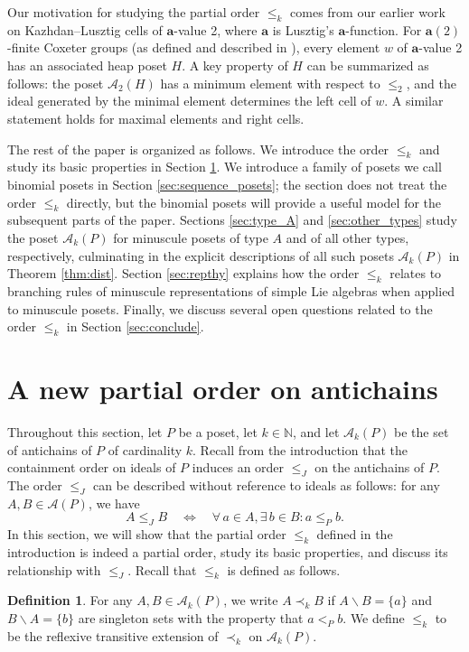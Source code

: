 \documentclass[11pt]{amsart}
\theoremstyle{plain}
\theoremstyle{definition}
\newtheorem{definition}[theorem]{Definition}
\theoremstyle{remark}
\numberwithin{equation}{section}
\newcommand{\bfa}{\mathbf{a}}
\newcommand{\N}{\mathbb{N}}
\newcommand{\cala}{\mathcal{A}}
\newcommand{\akp}{\mathcal{A}_k(P)}
\begin{document}
Our motivation for studying the partial order $\le_k$ comes from our earlier work 
\cite{gx2} on Kazhdan--Lusztig cells of $\bfa$-value 2, where $\bfa$ is Lusztig's 
$\bfa$-function. For $\bfa(2)$-finite Coxeter groups (as defined and described 
in \cite{gx2}), every element $w$ of $\bfa$-value 2 has an associated
heap poset $H$. A key property of $H$ can be summarized as follows: the poset
$\cala_2(H)$ has a minimum element with respect to $\le_2$, and the ideal
generated by the minimal element determines the left cell of $w$. A similar
statement holds for maximal elements and right cells.

The rest of the paper is organized as follows. We introduce the order $\le_k$
and study its basic properties in Section \ref{sec:new_order}.  We introduce a
family of posets we call binomial posets in Section \ref{sec:sequence_posets}; 
the section does not treat the order $\le_k$ directly, but the binomial posets
will provide a useful model for the subsequent parts of the paper.  Sections
\ref{sec:type_A} and \ref{sec:other_types} study the poset $\cala_k(P)$ for
minuscule posets of type $A$ and of all other types, respectively, culminating
in the explicit descriptions of all such posets $\akp$ in Theorem
\ref{thm:dist}. Section \ref{sec:repthy} explains how the order $\le_k$ relates
to branching rules of minuscule representations of simple Lie algebras when
applied to minuscule posets. Finally, we discuss several open questions related
to the order $\le_k$ in Section \ref{sec:conclude}.



\section{A new partial order on antichains}
\label{sec:new_order}
Throughout this section, let $P$ be a poset, let $k\in \N$, and let $\cala_k(P)$
be the set of antichains of $P$ of cardinality $k$.  Recall from the
introduction that the containment order on ideals of $P$ induces an order
$\le_J$ on the antichains of $P$. The order $\leq_J$ can be
described without reference to ideals as follows: for any $A,B\in \cala(P)$, we
have  $$ A \leq_J B \quad \Longleftrightarrow \quad \forall\, a \in A, \exists\,
b \in B : a \leq_P b.$$ In this section, we will show that the partial order
$\le_k$ defined in the
introduction is indeed a partial order, study its basic
properties, and discuss its relationship with $\le_J$.
Recall that $\le_k$ is defined as follows. 

\begin{definition}\label{def:keydef}
For any $A,B\in \akp$, we write $A \prec_k B$ if $A \backslash B = \{a\}$ and $B
\backslash A = \{b\}$ are singleton sets with the property that $a <_P b$. We
define $\leq_k$ to be the reflexive transitive extension of $\prec_k$ on
$\cala_k(P)$.
\end{definition}
\end{document}
